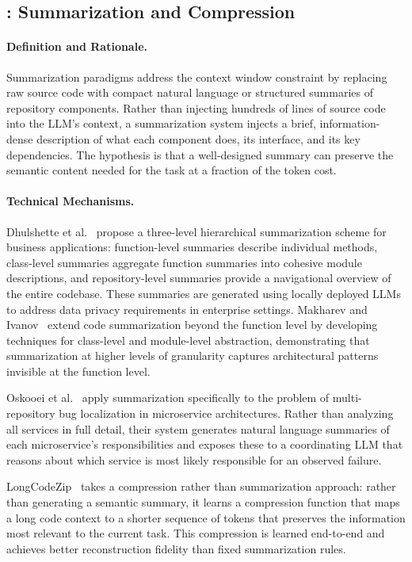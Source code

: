 \subsection{: Summarization and Compression}
\label{subsec:par5}

\paragraph{Definition and Rationale.}
Summarization paradigms address the context window constraint by replacing raw source code
with compact natural language or structured summaries of repository components. Rather than
injecting hundreds of lines of source code into the LLM's context, a summarization system
injects a brief, information-dense description of what each component does, its interface, and
its key dependencies. The hypothesis is that a well-designed summary can preserve the semantic
content needed for the task at a fraction of the token cost.

\paragraph{Technical Mechanisms.}
Dhulshette et al.~\cite{dhulshette2025hierarchical} propose a three-level hierarchical
summarization scheme for business applications: function-level summaries describe individual
methods, class-level summaries aggregate function summaries into cohesive module descriptions,
and repository-level summaries provide a navigational overview of the entire codebase.
These summaries are generated using locally deployed LLMs to address data privacy requirements
in enterprise settings. Makharev and Ivanov~\cite{makharev2025code} extend code summarization
beyond the function level by developing techniques for class-level and module-level abstraction,
demonstrating that summarization at higher levels of granularity captures architectural
patterns invisible at the function level.

Oskooei et al.~\cite{oskooei2025natural} apply summarization specifically to the problem of
multi-repository bug localization in microservice architectures. Rather than analyzing all
services in full detail, their system generates natural language summaries of each
microservice's responsibilities and exposes these to a coordinating LLM that reasons about
which service is most likely responsible for an observed failure.

LongCodeZip~\cite{shi2025longcodezip} takes a compression rather than summarization approach:
rather than generating a semantic summary, it learns a compression function that maps a long
code context to a shorter sequence of tokens that preserves the information most relevant to
the current task. This compression is learned end-to-end and achieves better reconstruction
fidelity than fixed summarization rules.


